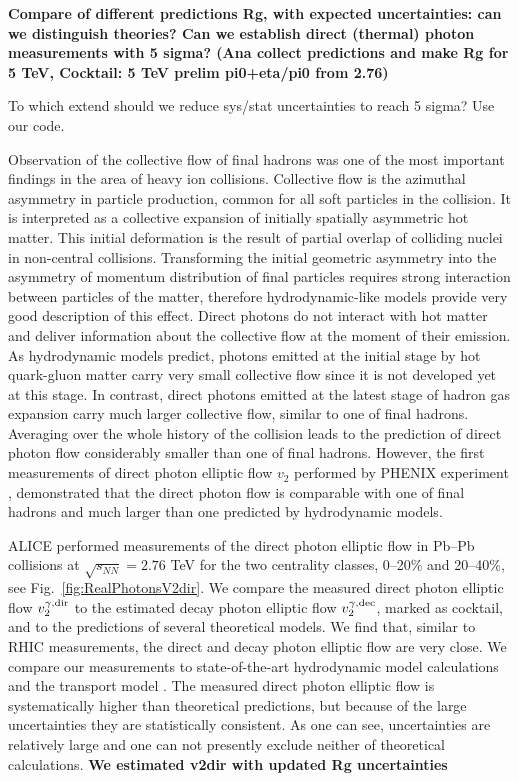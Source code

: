{\bf Compare of different predictions Rg, with expected uncertainties: can we distinguish theories? Can we establish direct (thermal) photon measurements with 5 sigma? (Ana collect predictions and make Rg for 5 TeV, Cocktail: 5 TeV prelim pi0+eta/pi0 from 2.76)

To which extend should we reduce sys/stat uncertainties to reach 5 sigma? Use our code.
}

Observation of the collective flow of final hadrons was one of the most important findings in the area of heavy ion collisions.
Collective flow is the azimuthal asymmetry in particle production, common for all soft particles in the collision. 
It is interpreted as a collective expansion of initially spatially asymmetric hot matter. This initial deformation is the result of partial overlap of colliding nuclei in non-central collisions.  Transforming the initial geometric asymmetry into the asymmetry of momentum distribution of final particles requires strong interaction between particles of the matter, therefore hydrodynamic-like models provide very good description of this effect. 
Direct photons do not interact with hot matter and deliver information about the collective  flow at the moment of their emission. As hydrodynamic models predict, photons emitted at the initial stage by hot quark-gluon matter carry very small collective flow since it is not developed yet at this stage. In contrast, direct photons emitted at the latest stage of hadron gas expansion carry much larger collective flow, similar to one of final hadrons. 
Averaging over the whole history of the collision leads to the prediction of direct photon flow considerably smaller than one of final hadrons. 
However, the first measurements of direct photon elliptic flow $v_{2}$ performed by PHENIX experiment \cite{Adare:2011zr}, demonstrated that the direct photon flow is comparable with one of final hadrons and much larger than one predicted by hydrodynamic models. 

ALICE performed measurements of the direct photon elliptic flow in Pb--Pb collisions at $\sqrt{s_{NN}}=2.76$ TeV for the two centrality classes, 0--20\% and 20--40\%, see Fig.~\ref{fig:RealPhotonsV2dir}.
We compare the measured direct photon elliptic flow $v_2^{\gamma,\rm dir}$ to the estimated decay photon elliptic flow $v_2^{\gamma,\rm dec}$, marked as cocktail, and to the predictions of several theoretical models. We find that, similar to RHIC measurements, the direct and decay photon elliptic flow are very close. 
We compare our measurements to state-of-the-art hydrodynamic model calculations \cite{Gale:2014dfa,Chatterjee:2017akg} and the transport model \cite{Linnyk:2015tha}. The measured direct photon elliptic flow is systematically higher than theoretical predictions, but because of the large uncertainties they are statistically consistent. As one can see, uncertainties are relatively large and one can not presently exclude neither of theoretical calculations. 
{\bf We estimated v2dir with updated Rg uncertainties}

